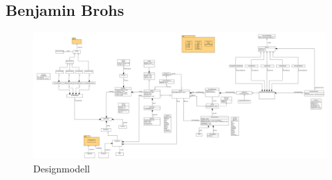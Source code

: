 \documentclass{article}
\begin{document}
\subsection*{Benjamin Brohs}
\begin{mylist}
\end{mylist}
\fi

\newpage

\begin{figure} [ht]
  \centering
  \includegraphics[angle=90,width=.65\linewidth]{design_full.png}
  \caption{Designmodell}
  \label{pic:design}
\end{figure}

\end{document}
